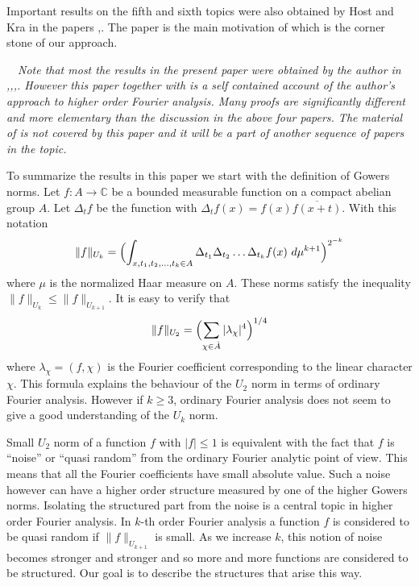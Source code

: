 \documentclass [11pt] {article}
\begin{document}
\medskip




Important results on the fifth and sixth topics were also obtained by Host and Kra in the papers \cite{HKr2},\cite{HKr3}.
The paper \cite{HKr2} is the main motivation of \cite{NP} which is the corner stone of our approach.

\bigskip

~~{\it Note that most the results in the present paper were obtained by the author in \cite{Sz1},\cite{Sz2},\cite{Sz3},\cite{Sz4}. However this paper together with \cite{NP} is a self contained account of the author's approach to higher order Fourier analysis. Many proofs are significantly different and more elementary than the discussion in the above four papers. 
The material of \cite{Sz5} is not covered by this paper and it will be a part of another sequence of papers in the topic.} 

\bigskip

To summarize the results in this paper we start with the definition of Gowers norms.
Let $f:A\rightarrow\mathbb{C}$ be a bounded measurable function on a compact abelian group $A$. Let $\Delta_t f$ be the function with $\Delta_tf(x)=f(x)\overline{f(x+t)}$.
With this notation
$$\|f\|_{U_k}=\Bigl(\int_{x,t_1,t_2,\dots,t_k\in A}\Delta_{t_1}\Delta_{t_2}\dots\Delta_{t_k}f(x)~d\mu^{k+1}\Bigr)^{2^{-k}}$$
where $\mu$ is the normalized Haar measure on $A$.
These norms satisfy the inequality $\|f\|_{U_k}\leq\|f\|_{U_{k+1}}$.
It is easy to verify that
\begin{equation}\label{u2norm}
\|f\|_{U_2}=\Bigl(\sum_{\chi\in\hat{A}}|\lambda_\chi|^4\Bigr)^{1/4}
\end{equation}
where $\lambda_\chi=(f,\chi)$ is the Fourier coefficient corresponding to the linear character $\chi$.
This formula explains the behaviour of the $U_2$ norm in terms of ordinary Fourier analysis.
However if $k\geq 3$, ordinary Fourier analysis does not seem to give a good understanding of the $U_k$ norm.

Small $U_2$ norm of a function $f$ with $|f|\leq 1$ is equivalent with the fact that $f$ is ``noise'' or ``quasi random'' from the ordinary Fourier analytic point of view. This means that all the Fourier coefficients have small absolute value. Such a noise however can have a higher order structure measured by one of the higher Gowers norms.
Isolating the structured part from the noise is a central topic in higher order Fourier analysis.   
In $k$-th order Fourier analysis a function $f$ is considered to be quasi random if $\|f\|_{U_{k+1}}$ is small.
As we increase $k$, this notion of noise becomes stronger and stronger and so more and more functions are considered to be structured. Our goal is to describe the structures that arise this way.
\end{document}
